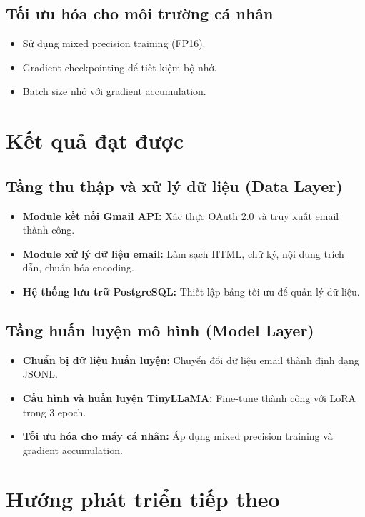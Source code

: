 \documentclass[../DoAn.tex]{subfiles}
\begin{document}
\subsection{Tối ưu hóa cho môi trường cá nhân}
\begin{itemize}
    \item Sử dụng mixed precision training (FP16).
    \item Gradient checkpointing để tiết kiệm bộ nhớ.
    \item Batch size nhỏ với gradient accumulation.
\end{itemize}

\section{Kết quả đạt được}

\subsection{Tầng thu thập và xử lý dữ liệu (Data Layer)}
\begin{itemize}
    \item \textbf{Module kết nối Gmail API:} Xác thực OAuth 2.0 và truy xuất email thành công.
    \item \textbf{Module xử lý dữ liệu email:} Làm sạch HTML, chữ ký, nội dung trích dẫn, chuẩn hóa encoding.
    \item \textbf{Hệ thống lưu trữ PostgreSQL:} Thiết lập bảng tối ưu để quản lý dữ liệu.
\end{itemize}

\subsection{Tầng huấn luyện mô hình (Model Layer)}
\begin{itemize}
    \item \textbf{Chuẩn bị dữ liệu huấn luyện:} Chuyển đổi dữ liệu email thành định dạng JSONL.
    \item \textbf{Cấu hình và huấn luyện TinyLLaMA:} Fine-tune thành công với LoRA trong 3 epoch.
    \item \textbf{Tối ưu hóa cho máy cá nhân:} Áp dụng mixed precision training và gradient accumulation.
\end{itemize}

\section{Hướng phát triển tiếp theo}
\end{document}
